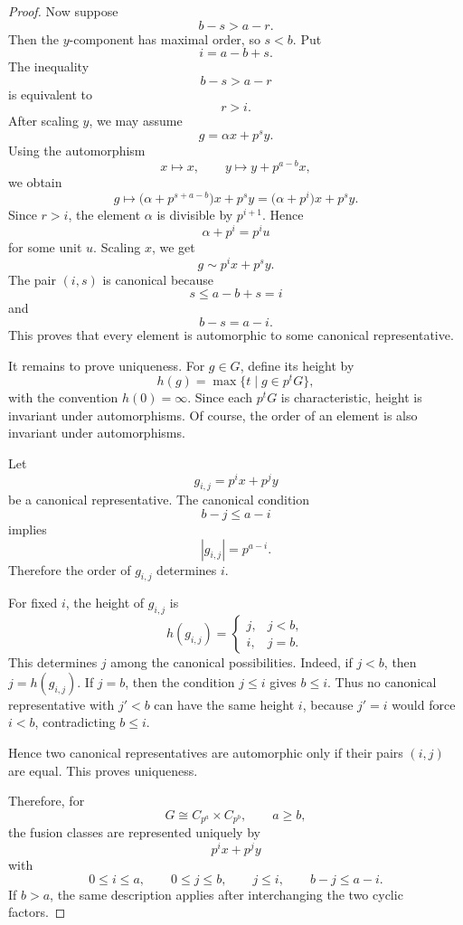 \begin{proof}
    Now suppose
    \[
        b-s>a-r.
    \]
    Then the \(y\)-component has maximal order, so \(s<b\). Put
    \[
        i=a-b+s.
    \]
    The inequality
    \[
        b-s>a-r
    \]
    is equivalent to
    \[
        r>i.
    \]
    After scaling \(y\), we may assume
    \[
        g=\alpha x+p^s y.
    \]
    Using the automorphism
    \[
        x\mapsto x,
        \qquad
        y\mapsto y+p^{a-b}x,
    \]
    we obtain
    \[
        g\mapsto
        \bigl(\alpha+p^{s+a-b}\bigr)x+p^s y
        =
        \bigl(\alpha+p^i\bigr)x+p^s y.
    \]
    Since \(r>i\), the element \(\alpha\) is divisible by \(p^{i+1}\). Hence
    \[
        \alpha+p^i=p^i u
    \]
    for some unit \(u\). Scaling \(x\), we get
    \[
        g\sim p^i x+p^s y.
    \]
    The pair \((i,s)\) is canonical because
    \[
        s\leq a-b+s=i
    \]
    and
    \[
        b-s=a-i.
    \]
    This proves that every element is automorphic to some canonical representative.
    
    It remains to prove uniqueness. For \(g\in G\), define its height by
    \[
        h(g)=\max\{t\mid g\in p^tG\},
    \]
    with the convention \(h(0)=\infty\). Since each \(p^tG\) is characteristic,
    height is invariant under automorphisms. Of course, the order of an element is
    also invariant under automorphisms.
    
    Let
    \[
        g_{i,j}=p^i x+p^j y
    \]
    be a canonical representative. The canonical condition
    \[
        b-j\leq a-i
    \]
    implies
    \[
        |g_{i,j}|=p^{a-i}.
    \]
    Therefore the order of \(g_{i,j}\) determines \(i\).
    
    For fixed \(i\), the height of \(g_{i,j}\) is
    \[
        h(g_{i,j})=
        \begin{cases}
            j, & j<b,\\
            i, & j=b.
        \end{cases}
    \]
    This determines \(j\) among the canonical possibilities. Indeed, if \(j<b\), then
    \(j=h(g_{i,j})\). If \(j=b\), then the condition \(j\leq i\) gives \(b\leq i\).
    Thus no canonical representative with \(j'<b\) can have the same height \(i\),
    because \(j'=i\) would force \(i<b\), contradicting \(b\leq i\).
    
    Hence two canonical representatives are automorphic only if their pairs
    \((i,j)\) are equal. This proves uniqueness.
    
    Therefore, for
    \[
        G\cong C_{p^a}\times C_{p^b},
        \qquad a\geq b,
    \]
    the fusion classes are represented uniquely by
    \[
        p^i x+p^j y
    \]
    with
    \[
        0\leq i\leq a,
        \qquad
        0\leq j\leq b,
        \qquad
        j\leq i,
        \qquad
        b-j\leq a-i.
    \]
    If \(b>a\), the same description applies after interchanging the two cyclic
    factors.
    \end{proof}

